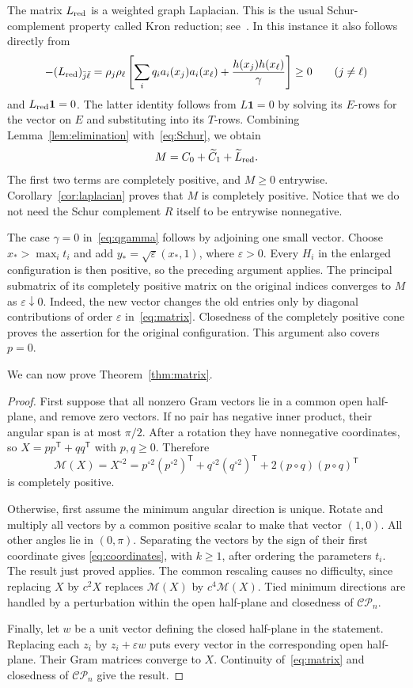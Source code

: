 \documentclass[11pt]{article}
\theoremstyle{remark}
\newcommand{\CP}{\mathcal{CP}}
\newcommand{\M}{\mathcal M}
\begin{document}
The matrix $L_{\rm red}$ is a weighted graph Laplacian. This is the usual
Schur-complement property called Kron reduction; see~\cite{DB}.
In this instance it also follows directly from
\[
 -(L_{\rm red})_{\bar j\bar\ell}
 =\rho_j\rho_\ell\left[
   \sum_iq_i a_i(x_j)a_i(x_\ell)+\frac{h(x_j)h(x_\ell)}\gamma
   \right]\ge0\qquad(j\ne\ell)
\]
and $L_{\rm red}\mathbf1=0$.
The latter identity follows from $L\mathbf1=0$ by solving its $E$-rows for
the vector on $E$ and substituting into its $T$-rows.
Combining Lemma~\ref{lem:elimination} with~\eqref{eq:Schur}, we obtain
\[
 M=C_0+\widetilde C_1+\widetilde L_{\rm red}.
\]
The first two terms are completely positive, and $M\ge0$ entrywise.
Corollary~\ref{cor:laplacian} proves that $M$ is completely positive.
Notice that we do not need the Schur complement $R$ itself to be entrywise
nonnegative.

The case $\gamma=0$ in~\eqref{eq:qgamma} follows by adjoining one small vector.
Choose $x_*>\max_i t_i$ and add
$y_*=\sqrt\varepsilon(x_*,1)$, where $\varepsilon>0$.
Every $H_i$ in the enlarged configuration is then positive, so the preceding
argument applies. The principal submatrix of its completely positive matrix
on the original indices converges to $M$ as $\varepsilon\downarrow0$.
Indeed, the new vector changes the old entries only by diagonal contributions
of order $\varepsilon$ in~\eqref{eq:matrix}.
Closedness of the completely positive cone proves the assertion for the
original configuration. This argument also covers $p=0$.

We can now prove Theorem~\ref{thm:matrix}.
\begin{proof}
First suppose that all nonzero Gram vectors lie in a common open half-plane,
and remove zero vectors. If no pair has negative inner product, their angular
span is at most $\pi/2$. After a rotation they have nonnegative coordinates,
so $X=pp^{\mathsf T}+qq^{\mathsf T}$ with $p,q\ge0$. Therefore
\[
 \M(X)=X^{\circ2}
 =p^{\circ2}(p^{\circ2})^{\mathsf T}
  +q^{\circ2}(q^{\circ2})^{\mathsf T}
  +2(p\circ q)(p\circ q)^{\mathsf T}
\]
is completely positive.

Otherwise, first assume the minimum angular direction is unique.
Rotate and multiply all vectors by a common positive scalar to make that
vector $(1,0)$. All other angles lie in $(0,\pi)$.
Separating the vectors by the sign of their first coordinate gives
\eqref{eq:coordinates}, with $k\ge1$, after ordering the parameters $t_i$.
The result just proved applies. The common rescaling causes no difficulty,
since replacing $X$ by $c^2X$ replaces $\M(X)$ by $c^4\M(X)$.
Tied minimum directions are handled by a perturbation within the open
half-plane and closedness of $\CP_n$.

Finally, let $w$ be a unit vector defining the closed half-plane in the
statement. Replacing each $z_i$ by $z_i+\varepsilon w$ puts every vector in
the corresponding open half-plane. Their Gram matrices converge to $X$.
Continuity of~\eqref{eq:matrix} and closedness of $\CP_n$ give the result.
\end{proof}
\end{document}
